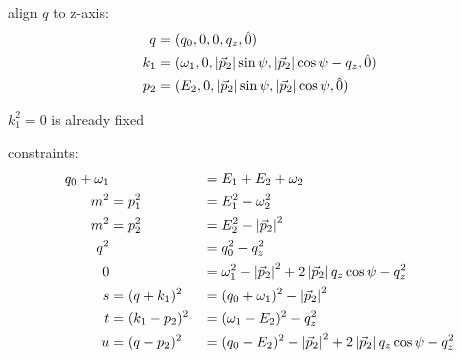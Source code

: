 align $q$ to z-axis:
\begin{align}
q &= (q_0,0,0,q_z,\hat 0)\\
k_1 &= (\omega_1,0,\left|\vec p_2\right|\sin\psi,\left|\vec p_2\right|\cos\psi-q_z, \hat 0)\\
p_2 &= (E_2,0,\left|\vec p_2\right|\sin\psi,\left|\vec p_2\right|\cos\psi, \hat 0)
\end{align}

$k_1^2 = 0$ is already fixed

constraints:
\begin{align}
q_0+\omega_1 & &&=E_1+E_2+\omega_2 \label{eq:PSConIIMomCon}\\
m^2 &= p_1^2 &&= E_1^2 - \omega_2^2 \label{eq:PSConIIp1}\\
m^2 &= p_2^2 &&= E_2^2 - \left|\vec p_2\right|^2 \label{eq:PSConIIp2} \\
q^2 & &&= q_0^2 - q_z^2 \label{eq:PSConIIq}\\
0 & &&= \omega_1^2 - \left|\vec p_2\right|^2 + 2\left|\vec p_2\right|q_z\cos\psi-q_z^2 \label{eq:PSConIIk1}\\
s &= (q+k_1)^2 &&= (q_0+\omega_1)^2 - \left|\vec p_2\right|^2 \label{eq:PSConIIs}\\
t &= (k_1-p_2)^2 &&= (\omega_1-E_2)^2-q_z^2 \label{eq:PSConIIt}\\
u &= (q-p_2)^2 &&= (q_0-E_2)^2 - \left|\vec p_2\right|^2+2\left|\vec p_2\right|q_z\cos\psi - q_z^2 \label{eq:PSConIIu}
\end{align}

